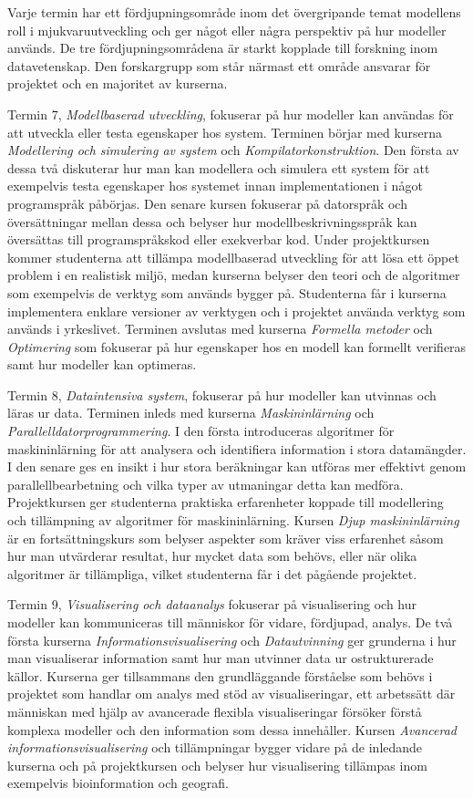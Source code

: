 Varje termin har ett fördjupningsområde inom det övergripande temat modellens roll i mjukvaruutveckling och ger något eller några perspektiv på hur modeller används. De tre fördjupningsområdena är starkt kopplade till forskning inom datavetenskap. Den forskargrupp som står närmast ett område ansvarar för projektet och en majoritet av kurserna.

Termin 7, \emph{Modellbaserad utveckling}, fokuserar på hur modeller kan användas för att utveckla eller testa egenskaper hos system. Terminen börjar med kurserna \emph{Modellering och simulering av system} och \emph{Kompilatorkonstruktion}. Den första av dessa två diskuterar hur man kan modellera och simulera ett system för att exempelvis testa egenskaper hos systemet innan implementationen i något programspråk påbörjas. Den senare kursen fokuserar på datorspråk och översättningar mellan dessa och belyser hur modellbeskrivningsspråk kan översättas till programspråkskod eller exekverbar kod. Under projektkursen kommer studenterna att tillämpa modellbaserad utveckling för att lösa ett öppet problem i en realistisk miljö, medan kurserna belyser den teori och de algoritmer som exempelvis de verktyg som används bygger på. Studenterna får i kurserna implementera enklare versioner av verktygen och i projektet använda verktyg som används i yrkeslivet. Terminen avslutas med kurserna \emph{Formella metoder} och \emph{Optimering} som fokuserar på hur egenskaper hos en modell kan formellt verifieras samt hur modeller kan optimeras.

Termin 8, \emph{Dataintensiva system}, fokuserar på hur modeller kan utvinnas och läras ur data. Terminen inleds med kurserna \emph{Maskininlärning} och \emph{Parallelldatorprogrammering}. I den första introduceras algoritmer för maskininlärning för att analysera och identifiera information i stora datamängder. I den senare ges en insikt i hur stora beräkningar kan utföras mer effektivt genom parallellbearbetning och vilka typer av utmaningar detta kan medföra. Projektkursen ger studenterna praktiska erfarenheter koppade till modellering och tillämpning av algoritmer för maskininlärning. Kursen \emph{Djup maskininlärning} är en fortsättningskurs som belyser aspekter som kräver viss erfarenhet såsom hur man utvärderar resultat, hur mycket data som behövs, eller när olika algoritmer är tillämpliga, vilket studenterna får i det pågående projektet.

Termin 9, \emph{Visualisering och dataanalys} fokuserar på visualisering och hur modeller kan kommuniceras till människor för vidare, fördjupad, analys. De två första kurserna \emph{Informationsvisualisering} och \emph{Datautvinning} ger grunderna i hur man visualiserar information samt hur man utvinner data ur ostrukturerade källor. Kurserna ger tillsammans den grundläggande förståelse som behövs i projektet som handlar om analys med stöd av visualiseringar, ett arbetssätt där människan med hjälp av avancerade flexibla visualiseringar försöker förstå komplexa modeller och den information som dessa innehåller. Kursen \emph{Avancerad informationsvisualisering} och tillämpningar bygger vidare på de inledande kurserna och på projektkursen och belyser hur visualisering tillämpas inom exempelvis bioinformation och geografi.

